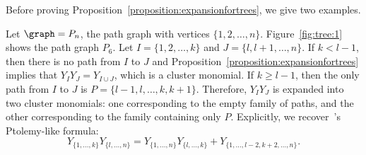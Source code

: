Before proving Proposition~\ref{proposition:expansionfortrees},
we give two examples.

\begin{exam}
    Let \(\graph = P_n\), the path graph with vertices \(\{1, 2, \dots, n\}\).
    Figure~\ref{fig:tree:1} shows the path graph \(P_6\).
    Let \(I = \{1, 2, \dots, k\}\) and \(J = \{l, l+1, \dots, n\}\).
    If \(k < l - 1\), then there is no path from \(I\) to \(J\) and Proposition~\ref{proposition:expansionfortrees} implies that \(Y_{I} Y_{J} = Y_{I \cup J}\), which is a cluster monomial.
    If \(k \geq l - 1\), then the only path from \(I\) to \(J\) is \(P=\{l-1, l, \dots, k, k+1\}\).
    Therefore, \(Y_{I} Y_{J}\) is expanded into two cluster monomials:
    one corresponding to the empty family of paths,
    and the other corresponding to the family containing only \(P\).
    Explicitly, we recover~\cite[Theorem~6.1]{linearLP}'s Ptolemy-like formula:
    \begin{equation*}
        Y_{\{1, \dots, k\}} Y_{\{l, \dots, n\}}
        = Y_{\{1, \dots, n\}} Y_{\{l, \dots, k\}}
          + Y_{\{1, \dots, l-2, k+2, \dots, n\}}.
    \end{equation*}
\end{exam}

